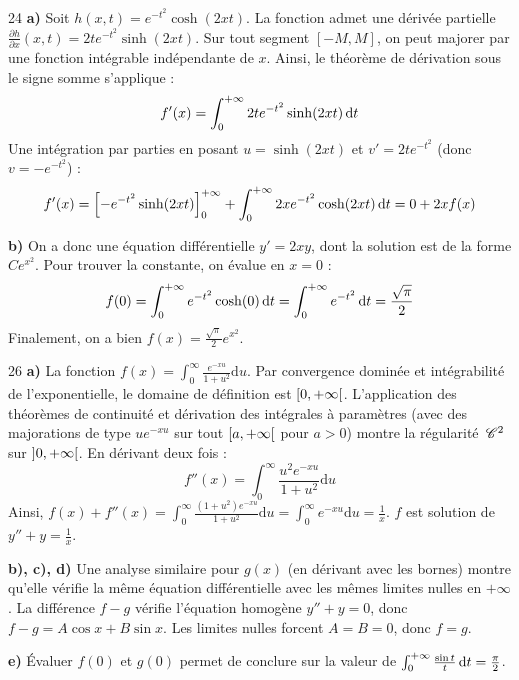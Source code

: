\begin{correction}{24}
\textbf{a)} Soit $h(x, t) = e^{-t^2}\cosh(2xt)$. La fonction admet une dérivée partielle $\frac{\partial h}{\partial x}(x, t) = 2t e^{-t^2}\sinh(2xt)$.
Sur tout segment $[-M, M]$, on peut majorer par une fonction intégrable indépendante de $x$.
Ainsi, le théorème de dérivation sous le signe somme s'applique :
$$ f'(x) = \int_{0}^{+\infty} 2t e^{-t^2}\sinh(2xt) \,\mathrm{d}t $$
Une intégration par parties en posant $u = \sinh(2xt)$ et $v' = 2te^{-t^2}$ (donc $v = -e^{-t^2}$) :
$$ f'(x) = \left[ -e^{-t^2}\sinh(2xt) \right]_0^{+\infty} + \int_{0}^{+\infty} 2x e^{-t^2}\cosh(2xt) \,\mathrm{d}t = 0 + 2xf(x) $$

\textbf{b)} On a donc une équation différentielle $y' = 2xy$, dont la solution est de la forme $C e^{x^2}$.
Pour trouver la constante, on évalue en $x=0$ :
$$ f(0) = \int_{0}^{+\infty} e^{-t^2} \cosh(0) \,\mathrm{d}t = \int_{0}^{+\infty} e^{-t^2} \,\mathrm{d}t = \frac{\sqrt{\pi}}{2} $$
Finalement, on a bien $f(x) = \frac{\sqrt{\pi}}{2} e^{x^2}$.
\end{correction}

\begin{correction}{26}
\textbf{a)} La fonction $f(x) = \int_{0}^{\infty}\frac{e^{-xu}}{1+u^{2}}\mathrm{d}u$. Par convergence dominée et intégrabilité de l'exponentielle, le domaine de définition est $\left[0, +\infty\right[$. 
L'application des théorèmes de continuité et dérivation des intégrales à paramètres (avec des majorations de type $u e^{-xu}$ sur tout $\left[a, +\infty\right[$ pour $a>0$) montre la régularité $\,\mathscr C^{2}$ sur $\left]0, +\infty\right[$.
En dérivant deux fois :
$$ f''(x) = \int_{0}^{\infty} \frac{u^2 e^{-xu}}{1+u^2} \mathrm{d}u $$
Ainsi, $f(x) + f''(x) = \int_{0}^{\infty} \frac{(1+u^2) e^{-xu}}{1+u^2} \mathrm{d}u = \int_{0}^{\infty} e^{-xu} \mathrm{d}u = \frac{1}{x}$.
$f$ est solution de $y'' + y = \frac{1}{x}$.

\textbf{b), c), d)} Une analyse similaire pour $g(x)$ (en dérivant avec les bornes) montre qu'elle vérifie la même équation différentielle avec les mêmes limites nulles en $+\infty$. La différence $f-g$ vérifie l'équation homogène $y''+y=0$, donc $f-g = A\cos x + B\sin x$. Les limites nulles forcent $A=B=0$, donc $f=g$.

\textbf{e)} Évaluer $f(0)$ et $g(0)$ permet de conclure sur la valeur de $\int_{0}^{+\infty}\frac{\sin t}{t}\,\mathrm{d}t = \frac{\pi}{2}$.
\end{correction}